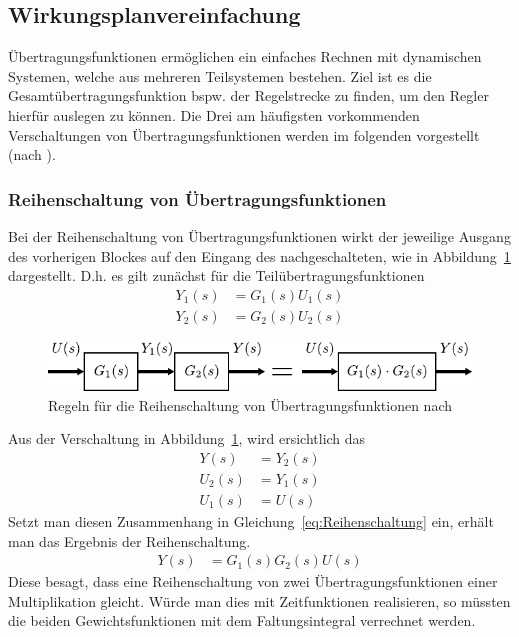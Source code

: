 \subsection{Wirkungsplanvereinfachung}
%
Übertragungsfunktionen ermöglichen ein einfaches Rechnen mit dynamischen Systemen, welche aus mehreren Teilsystemen bestehen. Ziel ist es die Gesamtübertragungsfunktion bspw. der Regelstrecke zu finden, um den Regler hierfür auslegen zu können. Die Drei am häufigsten vorkommenden Verschaltungen von Übertragungsfunktionen werden im folgenden vorgestellt (nach \cite{Lunze10}).
%
\subsubsection{Reihenschaltung von Übertragungsfunktionen}
%
Bei der Reihenschaltung von Übertragungsfunktionen wirkt der jeweilige Ausgang des vorherigen Blockes auf den Eingang des nachgeschalteten, wie in Abbildung~\ref{fig:Reiheschaltung} dargestellt. D.h. es gilt zunächst für die Teilübertragungsfunktionen
%
\begin{equation}
\begin{aligned}
%
Y_{1}(s)&=G_{1}(s)U_{1}(s)\\
Y_{2}(s)&=G_{2}(s)U_{2}(s)\label{eq:Reihenschaltung}
%
\end{aligned}
\end{equation} 
%
\begin{figure}[h]
	\centering
	\includegraphics[width=0.85\linewidth]{Abbildungen/Modellbildung/PDF/RechenregelnMult.pdf}
	\caption{Regeln für die Reihenschaltung von Übertragungsfunktionen nach \cite{Lunze10}}
	\label{fig:Reiheschaltung}
\end{figure}
%
Aus der Verschaltung in Abbildung~\ref{fig:Reiheschaltung}, wird ersichtlich das
%
\begin{equation*}
\begin{aligned}
%
Y(s)&=Y_{2}(s)\\
U_{2}(s)&=Y_{1}(s)\\
U_{1}(s)&=U(s)
%
\end{aligned}
\end{equation*} 
%
Setzt man diesen Zusammenhang in Gleichung~\ref{eq:Reihenschaltung} ein, erhält man das Ergebnis der Reihenschaltung.
%
\begin{equation*}
\begin{aligned}
%
Y(s)&=G_{1}(s)G_{2}(s)U(s)
%
\end{aligned}
\end{equation*} 
%
Diese besagt, dass eine Reihenschaltung von zwei Übertragungsfunktionen einer Multiplikation gleicht. Würde man dies mit Zeitfunktionen realisieren, so müssten die beiden Gewichtsfunktionen mit dem Faltungsintegral verrechnet werden.
%
